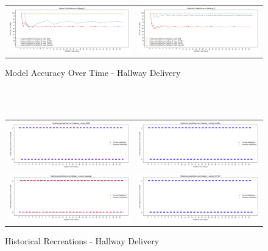 \begin{figure}
  \begin{tabular}{cc}
    {\includegraphics[width = 3in]{images/results/Future_Predictions_on_hallway_D.png}} &
    {\includegraphics[width = 3in]{images/results/Historical_Predictions_on_hallway_D.png}} \\
  \end{tabular}
  \caption{Model Accuracy Over Time - Hallway Delivery}
\end{figure}\\ \\


\begin{figure}
  \begin{tabular}{cc}
    {\includegraphics[width = 3in]{images/results/Historical_hallway_L_DMM.png}} &
    {\includegraphics[width = 3in]{images/results/Historical_hallway_L_FreMEn.png}} \\
    {\includegraphics[width = 3in]{images/results/Historical_hallway_L_Gaussian.png}} &
    {\includegraphics[width = 3in]{images/results/Historical_hallway_L_HyT-EM.png}} \\
  \end{tabular}
  \caption{Historical Recreations - Hallway Delivery}
\end{figure}

